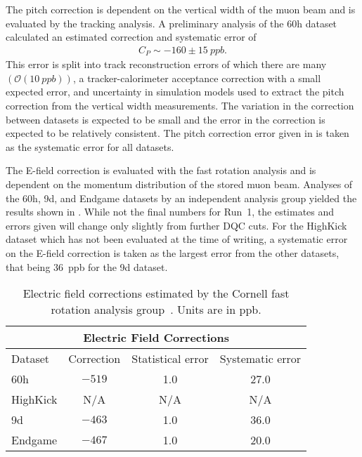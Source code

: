 The pitch correction is dependent on the vertical width of the muon beam and is evaluated by the tracking analysis. A preliminary analysis of the 60h dataset calculated an estimated correction and systematic error of~\cite{PitchReview,PitchElba}
    \begin{align} \label{eq:pitchError}
        C_{P} \sim -160 \pm \SI{15}{ppb}.
    \end{align}
This error is split into track reconstruction errors of which there are many $(\mathcal{O}(\SI{10}{ppb}))$, a tracker-calorimeter acceptance correction with a small expected error, and uncertainty in simulation models used to extract the pitch correction from the vertical width measurements. The variation in the correction between datasets is expected to be small and the error in the correction is expected to be relatively consistent. The pitch correction error given in  is taken as the systematic error for all datasets. 



The E-field correction is evaluated with the fast rotation analysis and is dependent on the momentum distribution of the stored muon beam. Analyses of the 60h, 9d, and Endgame datasets by an independent analysis group yielded the results shown in . While not the final numbers for Run~1, the estimates and errors given will change only slightly from further DQC cuts. For the HighKick dataset which has not been evaluated at the time of writing, a systematic error on the E-field correction is taken as the largest error from the other datasets, that being \SI{36}{ppb} for the 9d dataset.


\begin{table}
\centering
\renewcommand{\arraystretch}{1.2}
\begin{tabular*}{\linewidth}{@{\extracolsep{\fill}}lccc}
  \hline
    \multicolumn{4}{c}{\textbf{Electric Field Corrections}} \\
  \hline\hline
    Dataset & Correction & Statistical error & Systematic error \\
  \hline
    60h & $-519$ & 1.0 & 27.0 \\
    HighKick & N/A & N/A & N/A \\
    9d & $-463$ & 1.0 & 36.0 \\
    Endgame & $-467$ & 1.0 & 20.0 \\
  \hline
\end{tabular*}
\caption[Electric field corrections estimated by the Cornell fast rotation analysis group]{Electric field corrections estimated by the Cornell fast rotation analysis group~\cite{AntoineEField60h,AntoineEField9d,AntoineEFieldEndgame}. Units are in ppb.}
\label{tab:EfieldCorrections}
\end{table}



